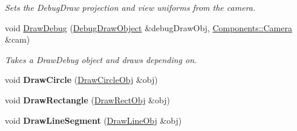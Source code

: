 \begin{DoxyCompactItemize}
\begin{DoxyCompactList}\small\item\em Sets the Debug\-Draw projection and view uniforms from the camera. \end{DoxyCompactList}\item 
void \hyperlink{classDCEngine_1_1Systems_1_1GraphicsGL_a76e1459d66f578a6b09c7851dd5e2cbc}{Draw\-Debug} (\hyperlink{classDCEngine_1_1DebugDrawObject}{Debug\-Draw\-Object} \&debug\-Draw\-Obj, \hyperlink{classDCEngine_1_1Components_1_1Camera}{Components\-::\-Camera} \&cam)
\begin{DoxyCompactList}\small\item\em Takes a Draw\-Debug object and draws depending on. \end{DoxyCompactList}\item 
\hypertarget{classDCEngine_1_1Systems_1_1GraphicsGL_af5c535a45be89c8b17ba3c586f23ae81}{void {\bfseries Draw\-Circle} (\hyperlink{classDCEngine_1_1DrawCircleObj}{Draw\-Circle\-Obj} \&obj)}\label{classDCEngine_1_1Systems_1_1GraphicsGL_af5c535a45be89c8b17ba3c586f23ae81}

\item 
\hypertarget{classDCEngine_1_1Systems_1_1GraphicsGL_a9b47ccc34dc750b32f8ae71172811dc9}{void {\bfseries Draw\-Rectangle} (\hyperlink{classDCEngine_1_1DrawRectObj}{Draw\-Rect\-Obj} \&obj)}\label{classDCEngine_1_1Systems_1_1GraphicsGL_a9b47ccc34dc750b32f8ae71172811dc9}

\item 
\hypertarget{classDCEngine_1_1Systems_1_1GraphicsGL_ad3a3f9b771e8752591c336fd329fb98f}{void {\bfseries Draw\-Line\-Segment} (\hyperlink{classDCEngine_1_1DrawLineObj}{Draw\-Line\-Obj} \&obj)}\label{classDCEngine_1_1Systems_1_1GraphicsGL_ad3a3f9b771e8752591c336fd329fb98f}


\end{DoxyCompactItemize}
